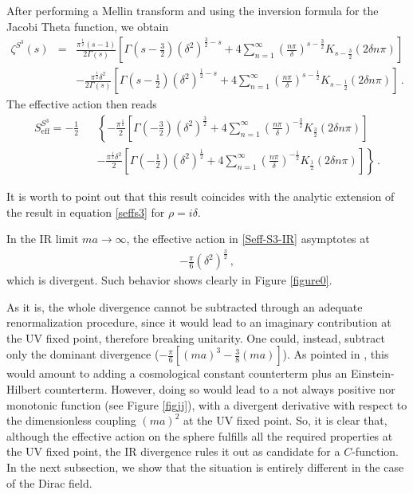 \documentclass[12pt,a4paper]{article}
\newcommand{\beq}{\begin{eqnarray}}
\newcommand{\eeq}{\end{eqnarray}}
\newcommand{\nn}{\nonumber}
\numberwithin{equation}{section}
\begin{document}
After performing a Mellin transform and using the inversion formula for the Jacobi Theta function, we obtain
\beq
\zeta^{S^3}(s) &=& \frac{{\pi}^{\frac12} (s-1)}{2 \Gamma(s)} \left[\Gamma(s-\tfrac32) ({\delta}^2 )^{\frac32-s} +
4 \sum_{n=1}^{\infty} \left(\frac{n \pi}{\delta}\right)^{s-\frac32} K_{s-\frac32}(2 \delta n \pi)\right]\nn \\
& &-
\frac{{\pi}^{\frac12} {\delta}^2}{2 \Gamma(s)} \left[\Gamma(s-\tfrac12) ({\delta}^2 )^{\frac12-s} +
4 \sum_{n=1}^{\infty} \left(\frac{n \pi}{\delta}\right)^{s-\frac12} K_{s-\frac12}(2 \delta n \pi)\right]\,.
\eeq
The effective action then reads
%
\beq
S_{\mathrm{eff}}^{S^3} = - \frac12 &&\left\{-\frac{{\pi}^{\frac12}}{2} \left[\Gamma(-\tfrac32) ({\delta}^2 )^{\frac32} +
4 \sum_{n=1}^{\infty} \left(\frac{n \pi}{\delta}\right)^{-\frac32} K_{\frac32}(2 \delta n \pi)\right]\right.\nn \\
 &&-\left.\frac{{\pi}^{\frac12} {\delta}^2}{2} \left[\Gamma(-\tfrac12) ({\delta}^2 )^{\frac12} +
4 \sum_{n=1}^{\infty} \left(\frac{n \pi}{\delta}\right)^{-\frac12} K_{\frac12}(2 \delta n \pi)\right]\right\}\,.
\label{Seff-S3-IR}\eeq

It is worth to point out that this result coincides with the analytic extension of the result in equation \eqref{seffs3} for $\rho=i\delta$.

In the IR limit $ma \rightarrow \infty$, the effective action in \eqref{Seff-S3-IR} asymptotes at
\beq
-\frac{\pi}{6} ({\delta}^2)^{\frac32}\,,\label{seffS3}
\eeq
which is divergent. Such behavior shows clearly in Figure \ref{figure0}.

As it is, the whole divergence cannot be subtracted through an adequate renormalization procedure, since it would lead to an imaginary contribution at the UV fixed point, therefore breaking unitarity. One could, instead, subtract only the dominant divergence ($-\frac{\pi}{6}[(ma)^3-\frac38 (ma)]$). As pointed in \cite{komleshouches}, this would amount to adding a cosmological constant counterterm plus an Einstein-Hilbert counterterm. However, doing so would lead to a not always positive nor monotonic function (see Figure \ref{figjj}), with a divergent derivative with respect to the dimensionless coupling $(ma)^2$ at the UV fixed point. So, it is clear that, although the effective action on the sphere fulfills all the required properties at the UV fixed point, the IR divergence rules it out as  candidate for a $\textit{C}$-function. In the next subsection, we show that the situation is entirely different in the case of the Dirac field.
\end{document}
